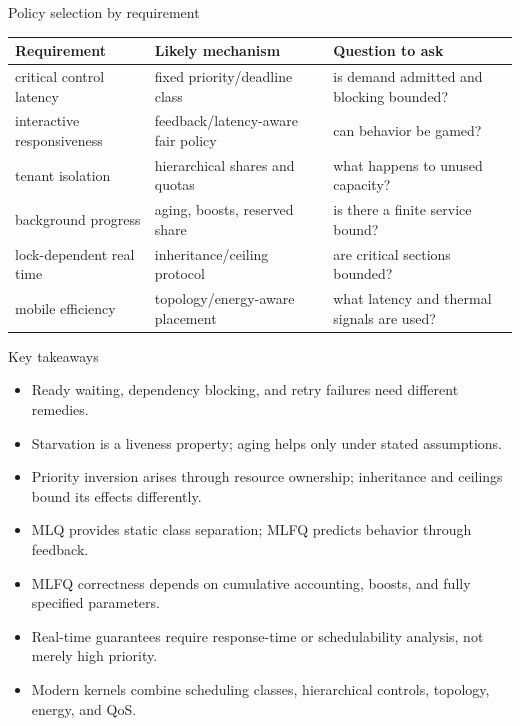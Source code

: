 \documentclass[aspectratio=169,11pt]{beamer}
\begin{document}
\begin{frame}{Policy selection by requirement}
  \small
  \begin{tabularx}{\textwidth}{@{}lXX@{}}
    \toprule
    \textbf{Requirement} & \textbf{Likely mechanism} & \textbf{Question to ask} \\
    \midrule
    critical control latency & fixed priority/deadline class & is demand admitted and blocking bounded? \\
    interactive responsiveness & feedback/latency-aware fair policy & can behavior be gamed? \\
    tenant isolation & hierarchical shares and quotas & what happens to unused capacity? \\
    background progress & aging, boosts, reserved share & is there a finite service bound? \\
    lock-dependent real time & inheritance/ceiling protocol & are critical sections bounded? \\
    mobile efficiency & topology/energy-aware placement & what latency and thermal signals are used? \\
    \bottomrule
  \end{tabularx}
\end{frame}

\begin{frame}{Key takeaways}
  \begin{itemize}
    \item Ready waiting, dependency blocking, and retry failures need different remedies.
    \item Starvation is a liveness property; aging helps only under stated assumptions.
    \item Priority inversion arises through resource ownership; inheritance and ceilings bound its effects differently.
    \item MLQ provides static class separation; MLFQ predicts behavior through feedback.
    \item MLFQ correctness depends on cumulative accounting, boosts, and fully specified parameters.
    \item Real-time guarantees require response-time or schedulability analysis, not merely high priority.
    \item Modern kernels combine scheduling classes, hierarchical controls, topology, energy, and QoS.
  \end{itemize}
\end{frame}
\end{document}
